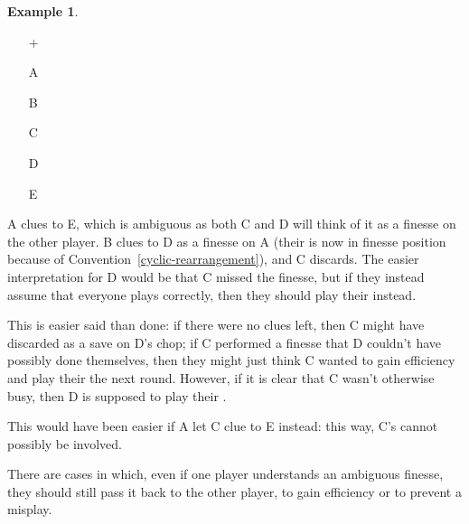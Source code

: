 \documentclass[a4paper]{article}
\theoremstyle{plain}
\theoremstyle{definition}
\newtheorem{example}[theorem]{Example}
\begin{document}
\begin{example}	\hfill \\
	\begin{minipage}{0.45\textwidth}
		\begin{itemize}
			\item[\Large +]      
			\item[\Large A]    
			\item[\Large B]    
			\item[\Large C]     
			\item[\Large D]    
			\item[\Large E]    
		\end{itemize}
	\end{minipage}%
	\begin{minipage}{0.55\textwidth}
		\label{ex:ambiguous-finesse}
		A clues  to E, which is ambiguous as both C and D will think of it as a finesse on the other player. B clues  to D as a finesse on A (their  is now in finesse position because of Convention~\ref{cyclic-rearrangement}), and C discards. The easier interpretation for D would be that C missed the finesse, but if they instead assume that everyone plays correctly, then they should play their  instead.
		
		This is easier said than done: if there were no clues left, then C might have discarded as a save on D's chop; if C performed a finesse that D couldn't have possibly done themselves, then they might just think C wanted to gain efficiency and play their  the next round. However, if it is clear that C wasn't otherwise busy, then D is supposed to play their .
		
		This would have been easier if A let C clue  to E instead: this way, C's  cannot possibly be involved.
	\end{minipage}
\end{example} \vspace{0.15 cm}

There are cases in which, even if one player understands an ambiguous finesse, they should still pass it back to the other player, to gain efficiency or to prevent a misplay.
\end{document}
